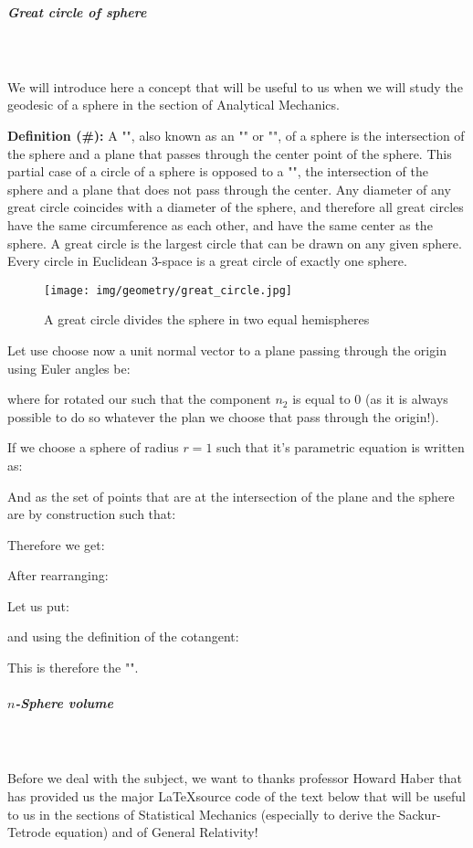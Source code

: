 {	\subparagraph{Great circle of sphere}\mbox{}\\\\
	We will introduce here a concept that will be useful to us when we will study the geodesic of a sphere in the section of Analytical Mechanics.
	
	\textbf{Definition (\#\mydef):}  A "", also known as an "" or "", of a sphere is the intersection of the sphere and a plane that passes through the center point of the sphere. This partial case of a circle of a sphere is opposed to a "", the intersection of the sphere and a plane that does not pass through the center. Any diameter of any great circle coincides with a diameter of the sphere, and therefore all great circles have the same circumference as each other, and have the same center as the sphere. A great circle is the largest circle that can be drawn on any given sphere. Every circle in Euclidean 3-space is a great circle of exactly one sphere.
	\begin{figure}[H]
		\centering
		\texttt{[image: img/geometry/great\_circle.jpg]}
		\caption{A great circle divides the sphere in two equal hemispheres}
	\end{figure}
	Let use choose now a unit normal vector to a plane passing through the origin using Euler angles be:
	
	where for rotated our such that the component $n_2$ is equal to $0$ (as it is always possible to do so whatever the plan we choose that pass through the origin!).
	
	If we choose a sphere of radius $r=1$ such that it's parametric equation is written as:
	
	And as the set of points that are at the intersection of the plane and the sphere are by construction such that:
	
	Therefore we get:
	
	After rearranging:
	
	Let us put:
	
	and using the definition of the cotangent:
	
	This is therefore the "".
	
	\subparagraph{$n$-Sphere volume}\mbox{}\\\\
	Before we deal with the subject, we want to thanks professor Howard Haber that has provided us the major \LaTeX source code of the text below that will be useful to us in the sections of Statistical Mechanics (especially to derive the Sackur-Tetrode equation) and of General Relativity!
	
}
